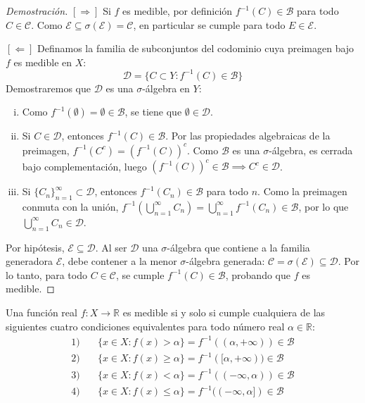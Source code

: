 \begin{proof}[Demostración]
	$[\Rightarrow]$ Si $f$ es medible, por definición $f^{-1}(C) \in \mathcal{B}$ para todo $C \in \mathcal{C}$. Como $\mathcal{E} \subseteq \sigma(\mathcal{E}) = \mathcal{C}$, en particular se cumple para todo $E \in \mathcal{E}$.
	
	$[\Leftarrow]$ Definamos la familia de subconjuntos del codominio cuya preimagen bajo $f$ es medible en $X$:
	$$ \mathcal{D} = \{ C \subset Y : f^{-1}(C) \in \mathcal{B} \} $$
	Demostraremos que $\mathcal{D}$ es una $\sigma$-álgebra en $Y$:
	\begin{enumerate}[i)]
		\item Como $f^{-1}(\emptyset) = \emptyset \in \mathcal{B}$, se tiene que $\emptyset \in \mathcal{D}$.
		\item Si $C \in \mathcal{D}$, entonces $f^{-1}(C) \in \mathcal{B}$. Por las propiedades algebraicas de la preimagen, $f^{-1}(C^c) = (f^{-1}(C))^c$. Como $\mathcal{B}$ es una $\sigma$-álgebra, es cerrada bajo complementación, luego $(f^{-1}(C))^c \in \mathcal{B} \implies C^c \in \mathcal{D}$.
		\item Si $\{C_n\}_{n=1}^\infty \subset \mathcal{D}$, entonces $f^{-1}(C_n) \in \mathcal{B}$ para todo $n$. Como la preimagen conmuta con la unión, $f^{-1}\left( \bigcup_{n=1}^\infty C_n \right) = \bigcup_{n=1}^\infty f^{-1}(C_n) \in \mathcal{B}$, por lo que $\bigcup_{n=1}^\infty C_n \in \mathcal{D}$.
	\end{enumerate}
	Por hipótesis, $\mathcal{E} \subseteq \mathcal{D}$. Al ser $\mathcal{D}$ una $\sigma$-álgebra que contiene a la familia generadora $\mathcal{E}$, debe contener a la menor $\sigma$-álgebra generada: $\mathcal{C} = \sigma(\mathcal{E}) \subseteq \mathcal{D}$. Por lo tanto, para todo $C \in \mathcal{C}$, se cumple $f^{-1}(C) \in \mathcal{B}$, probando que $f$ es medible.
\end{proof}

\begin{corolario}
	Una función real $f: X \to \mathbb{R}$ es medible si y solo si cumple cualquiera de las siguientes cuatro condiciones equivalentes para todo número real $\alpha \in \mathbb{R}$:
	\begin{align*}
		1)\quad & \{x \in X : f(x) > \alpha\} = f^{-1}((\alpha, +\infty)) \in \mathcal{B} \\
		2)\quad & \{x \in X : f(x) \ge \alpha\} = f^{-1}([\alpha, +\infty)) \in \mathcal{B} \\
		3)\quad & \{x \in X : f(x) < \alpha\} = f^{-1}((-\infty, \alpha)) \in \mathcal{B} \\
		4)\quad & \{x \in X : f(x) \le \alpha\} = f^{-1}((-\infty, \alpha]) \in \mathcal{B}
	\end{align*}
\end{corolario}

